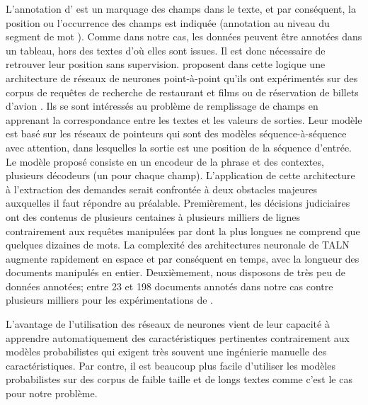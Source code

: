 L'annotation d'\citet{ace2005event} est un marquage des champs dans le texte, et par conséquent, la position ou l'occurrence des champs est indiquée (\og annotation au niveau du segment de mot \fg{}). Comme dans notre cas, les données peuvent être annotées dans un tableau, hors des textes d'où elles sont issues. Il est donc nécessaire de retrouver leur position sans supervision. \citet{palm2017e2e-dnn} proposent dans cette logique une architecture de réseaux de neurones point-à-point qu'ils ont expérimentés sur des corpus de requêtes de recherche de restaurant et films \citep{liu2013mitmovierestaurant} ou de réservation de billets d'avion \citep{price1990atis}. Ils se sont intéressés au problème de remplissage de champs en apprenant la correspondance entre les textes et les valeurs de sorties. Leur modèle est basé sur les réseaux de pointeurs \citep{vinyals2015pointernetworks} qui sont des modèles séquence-à-séquence avec attention, dans lesquelles la sortie est une position de la séquence d'entrée. Le modèle proposé consiste en un encodeur de la phrase et des contextes, plusieurs décodeurs (un pour chaque champ). L'application de cette architecture à l'extraction des demandes serait confrontée à deux obstacles majeures auxquelles il faut répondre au préalable. Premièrement, les décisions judiciaires ont des contenus de plusieurs centaines à plusieurs milliers de lignes contrairement aux requêtes manipulées par \citet{palm2017e2e-dnn}  dont la plus longues ne comprend que quelques dizaines de mots. La complexité des architectures neuronale de TALN augmente rapidement en espace et par conséquent en temps, avec la longueur des documents manipulés en entier. Deuxièmement, nous disposons de très peu de données annotées; entre 23 et 198 documents annotés dans notre cas contre plusieurs milliers pour les expérimentations de \citet{palm2017e2e-dnn}.

L'avantage de l'utilisation des réseaux de neurones vient de leur capacité à apprendre automatiquement des caractéristiques pertinentes contrairement aux modèles probabilistes qui exigent très souvent une ingénierie manuelle des caractéristiques. Par contre, il est beaucoup plus facile d'utiliser les modèles probabilistes sur des corpus de faible taille et de longs textes comme c'est le cas pour notre problème.


